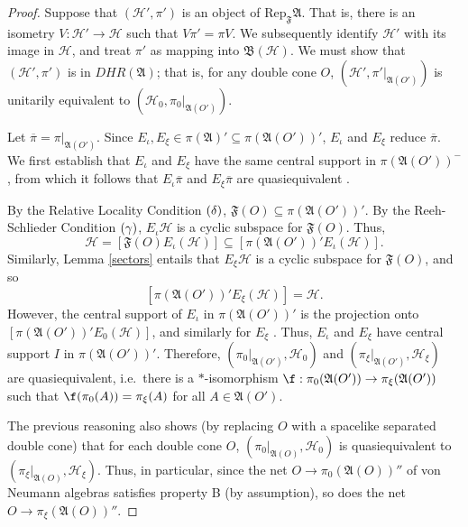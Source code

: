 \documentclass[12pt]{article}
\newcommand{\alg}[1]{\mathfrak{#1}}
\newcommand{\bh}{\mathfrak{B}(\mathcal{H})}
\theoremstyle{definition}
\theoremstyle{definition}
\theoremstyle{remark}
\def\2#1{{\mathcal #1}}
\def\ol#1{{\overline #1}}
\def\al#1{{\mathfrak #1}}
\newcommand{\Rep}{\mathrm{Rep}}
\begin{document}
\begin{proof} Suppose that $(\2H ',\pi ')$ is an object of $\Rep _{\al
    F}\al A$.  That is, there is an isometry $V:\2H '\to \2H$ such
  that $V\pi '=\pi V$.  We subsequently identify $\2H '$ with its
  image in $\2H$, and treat $\pi '$ as mapping into $\bh$.  We must
  show that $(\2H ',\pi ')$ is in $DHR(\al A)$; that is, for any
  double cone $O$, $(\2H ',\pi '|_{\alg{A}(O')})$ is unitarily
  equivalent to $(\2H_0,\pi _0|_{\alg{A}(O')})$.  

  Let $\overline{\pi}=\pi |_{\alg{A}(O')}$.  Since
  $E_{\iota},E_{\xi}\in \pi (\alg{A})'\subseteq \pi
  (\alg{A}(O'))'$, $E_{\iota}$ and $E_{\xi}$ reduce
  $\overline{\pi}$.  We first establish that
  $E_{\iota}$ and $E_{\xi}$ have the same central
  support in $\pi (\alg{A}(O'))^{-}$, from which it
  follows that $E_{\iota}\ol\pi$ and $E_{\xi}\ol\pi$
  are quasiequivalent \cite[Thm.\ 10.3.3]{kr}.

  By the Relative Locality Condition $(\boldmath{\delta})$,
  $\alg{F}(O)\subseteq \pi (\alg{A}(O'))'$.  By the Reeh-Schlieder
  Condition $(\boldmath{\gamma})$, $E_{\iota}\2H$ is a cyclic subspace
  for $\alg{F}(O)$.  Thus,
$$ \2H =[\alg{F}(O)E_{\iota}(\2H )]\subseteq [\pi (\alg{A}(O'))'E_{\iota}(\2H )] .$$  
Similarly, Lemma \ref{sectors} entails that
$E_{\xi}\2H$ is a cyclic subspace for $\alg{F}(O)$, and
so $$[\pi (\alg{A}(O'))'E_{\xi}(\2H )]=\2H.$$
However,
the central support of $E_\iota$ in $\pi
(\alg{A}(O'))'$ is the projection onto
$[\pi(\alg{A}(O'))'E_0(\2H )]$, and similarly for
$E_{\xi}$ \cite[Prop.\ 5.5.2]{kr}.  Thus, $E_{\iota}$
and $E_{\xi}$ have central support $I$ in $\pi
(\alg{A}(O'))'$.  Therefore, $(\pi
_{0}|_{\alg{A}(O')},\2H _0)$ and $(\pi
_{\xi}|_{\alg{A}(O')},\2H _{\xi})$ are quasiequivalent,
i.e.\ there is a $*$-isomorphism $\f :\pi
_0(\alg{A}(O'))\to \pi _{\xi}(\alg{A}(O'))$ such that
$\f (\pi _0(A))=\pi _{\xi}(A)$ for all $A\in
\alg{A}(O')$.

The previous reasoning also shows (by replacing $O$ with a spacelike
separated double cone) that for each double cone $O$, $(\pi
_{0}|_{\alg{A}(O)},\2H_0)$ is quasiequivalent to $(\pi
_{\xi}|_{\alg{A}(O)},\2H _{\xi})$.  Thus, in particular, since the net
$O\to \pi _0(\alg{A}(O))''$ of von Neumann algebras satisfies property
B (by assumption), so does the net $O\to \pi _{\xi}(\alg{A}(O))''$.


\end{proof}
\end{document}
